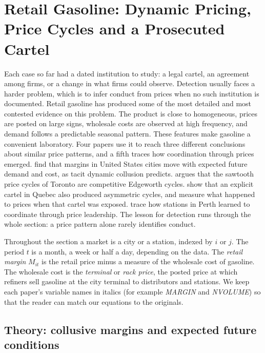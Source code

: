 \section{Retail Gasoline: Dynamic Pricing, Price Cycles and a Prosecuted Cartel}\label{sec:13-gasoline}

Each case so far had a dated institution to study: a legal cartel, an agreement among firms, or a change in what
firms could observe. Detection usually faces a harder problem, which is to infer conduct from prices when no such
institution is documented. Retail gasoline has produced some of the most detailed and most contested evidence on
this problem. The product is close to homogeneous, prices are posted on large signs, wholesale costs are observed at high frequency, and demand
follows a predictable seasonal pattern. These features make gasoline a convenient laboratory. Four papers use it
to reach three different conclusions about similar price patterns, and a fifth traces how coordination through prices emerged.
\citet{BorensteinShepard1996} find that margins in United States cities move with expected future demand and
cost, as tacit dynamic collusion predicts. \citet{Noel2007} argues that the sawtooth price cycles of Toronto are
competitive Edgeworth cycles. \citet{ClarkHoude2013} show that an explicit cartel in Quebec also produced
asymmetric cycles, and \citet{ErutkuHildebrand2010} measure what happened to prices when that cartel was
exposed. \citet{ByrneDeRoos2019} trace how stations in Perth learned to coordinate through price leadership. The
lesson for detection runs through the whole section: a price pattern alone rarely identifies conduct.

Throughout the section a market is a city or a station, indexed by $i$ or $j$. The period $t$ is a month, a
week or half a day, depending on the data. The \emph{retail margin} $M_{it}$ is the retail
price minus a measure of the wholesale cost of gasoline. The wholesale cost is the \emph{terminal} or
\emph{rack price}, the posted price at which refiners sell gasoline at the city terminal to distributors
and stations. We keep each paper's variable names in italics (for example \textit{MARGIN} and
\textit{NVOLUME}) so that the reader can match our equations to the originals.

\subsection{Theory: collusive margins and expected future conditions}\label{sec:13-gas-theory}

